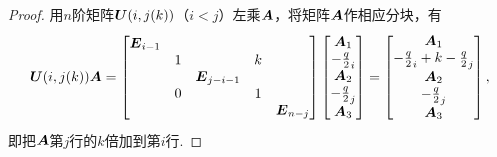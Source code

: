 \begin{property}
\begin{proof}
用\(n\)阶矩阵\(\P(i,j(k))\)（\(i < j\)）左乘\(\boldsymbol{A}\)，将矩阵\(\boldsymbol{A}\)作相应分块，有\[
	\P(i,j(k)) \A = \begin{bmatrix}
		\E_{i-1} \\
		& 1 & & k \\
		& & \E_{j-i-1} \\
		& 0 & & 1 \\
		& & & & \E_{n-j}
	\end{bmatrix}
	\begin{bmatrix}
		\A_1 \\ \a_i \\ \A_2 \\ \a_j \\ \A_3
	\end{bmatrix}
	= \begin{bmatrix}
		\A_1 \\ \a_i + k \a_j \\ \A_2 \\ \a_j \\ \A_3
	\end{bmatrix},
\]
即把\(\boldsymbol{A}\)第\(j\)行的\(k\)倍加到第\(i\)行.
\end{proof}
\end{property}
